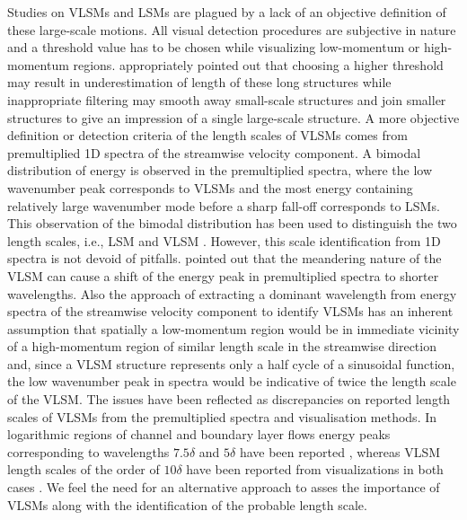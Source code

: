 Studies on VLSMs and LSMs are plagued by a lack of an objective definition of these large-scale motions. All visual detection procedures are subjective in nature and a threshold value has to be chosen while visualizing low-momentum or high-momentum regions. \citet{dennis_nickels_jfm2011} appropriately pointed out that choosing a higher threshold may result in underestimation of length of these long structures while inappropriate filtering may smooth away small-scale structures and join smaller structures to give an impression of a single large-scale structure. A more objective definition or detection criteria of the length scales of VLSMs comes from premultiplied 1D spectra of the streamwise velocity component. A bimodal distribution of energy is observed in the premultiplied spectra, where the low wavenumber peak corresponds to VLSMs and the most energy containing relatively large wavenumber mode before a sharp fall-off corresponds to LSMs. This observation of the bimodal distribution has been used to distinguish the two length scales, i.e., LSM and VLSM \citep{kim_adrian_pof99,balakumar_adrian_ptrs_07,guala_adrian_jfm2006}. However, this scale identification from 1D spectra is not devoid of pitfalls. \citet{hutchins_marusic_jfm2007}  pointed out that the meandering nature of the VLSM can cause a shift of the energy peak in premultiplied spectra to shorter wavelengths. Also the approach of extracting a dominant wavelength from energy spectra of the streamwise velocity component to identify VLSMs has an inherent assumption \citep{baltzer_jfm_13} that spatially a low-momentum region would be in immediate vicinity of a high-momentum region of similar length scale in the streamwise direction and, since a VLSM structure represents only a half cycle of a sinusoidal function, the low wavenumber peak in spectra would be indicative of twice the length scale of the VLSM. The issues have been reflected as discrepancies on reported length scales of VLSMs from the premultiplied spectra and visualisation methods. In logarithmic regions of channel and boundary layer flows energy peaks corresponding to wavelengths $7.5\delta$ and $5\delta$ have been reported \citep{balakumar_adrian_ptrs_07}, whereas VLSM length scales of the order of $10\delta$ have been reported from visualizations in both cases \citep{Lee_sung_jfm11,lee_sung_jfm_14,hutchins_marusic_jfm2007}. We feel the need for an alternative approach to asses the importance of VLSMs along with the identification of the probable length scale. 

